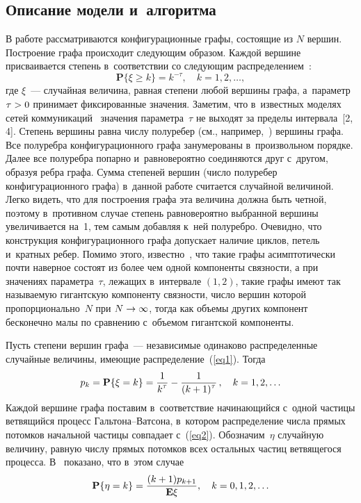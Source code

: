 \begin{multicols}{2}
\section{Описание модели и~алгоритма}

В работе рассматриваются конфигурационные графы, состоящие из $N$ вершин. 
Построение графа происходит
сле\-ду\-ющим образом. Каждой вершине присваивается степень в~соответствии со 
сле\-ду\-ющим распределением~\cite{RN}:
\begin{equation}
\label{eq1}
\mathbf{P}\{\xi \geqslant k\} = k^{-\tau}, \quad k=1,2,\dots,
\end{equation}
где $\xi$~--- случайная величина, равная степени любой вершины графа, а~параметр 
$\tau\hm>0$ принимает
фиксированные значения. Заметим, что в~известных моделях сетей 
коммуникаций~\cite{Dur, Hof1, Hof2, Fa, RN} значения параметра~$\tau$ не выходят за 
пределы интервала~[2, 4].
Степень вершины равна числу полуребер (см., например,~\cite{RN}) вершины графа.
Все полуребра конфигурационного графа занумерованы в~произвольном порядке. Далее 
все полуребра попарно и~равновероятно соединяются друг с~другом, образуя ребра графа.
Сумма степеней вершин (число полуребер конфигурационного графа) в~данной работе 
считается случайной
величиной. Легко видеть, что для построения графа эта величина должна быть 
четной, поэтому в~противном случае степень равновероятно выбранной вершины 
увеличивается на~1, тем самым добавляя к~ней полуребро. Очевидно, что 
конструкция конфигурационного графа допускает наличие циклов, петель и~кратных 
ребер. Помимо этого, известно~\cite{Dur, Hof1, RN}, что такие графы асимптотически 
почти наверное состоят из более чем одной компоненты связности, а при значениях 
параметра~$\tau$, лежащих в~интервале $(1,2)$, такие графы имеют так называемую 
гигантскую компоненту связности, число вершин которой пропорционально~$N$ при 
$N\hm\rightarrow\infty$, тогда как объемы других компонент бесконечно малы по 
сравнению с~объемом гигантской компоненты.

Пусть степени вершин графа~--- независимые одинаково распределенные случайные 
величины, имеющие распределение~(\ref{eq1}). Тогда
\begin{equation}
\label{eq2}
p_k = {\bf P}\{\xi = k\} = \displaystyle\frac{\displaystyle 1\mathstrut}{\displaystyle k^\tau\mathstrut} - \displaystyle\frac{\displaystyle 1\mathstrut}{\displaystyle (k+1)^\tau\mathstrut}\,, \quad 
k=1,2,\ldots
\end{equation}
Каждой вершине графа поставим в~соответствие начинающийся с~одной частицы 
ветвящийся процесс Галь\-то\-на--Ват\-со\-на, в~котором распределение числа прямых 
потомков начальной частицы совпадает с~(\ref{eq2}). Обозначим~$\eta$ случайную 
величину, равную числу прямых потомков всех остальных частиц ветвящегося 
процесса. В~\cite{Hof2} показано, что в~этом случае
\begin{equation*}
{\bf P}\{\eta = k\} = \displaystyle\frac{\displaystyle (k+1)p_{k+1}\mathstrut}{\displaystyle {\bf E}\xi\mathstrut}, \quad k=0,1,2,\ldots
\end{equation*}


\end{multicols}
